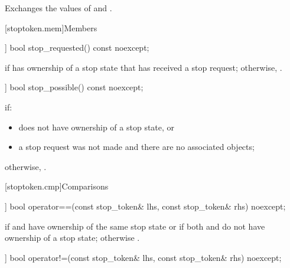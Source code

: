 \begin{itemdescr}
\pnum
\effects
Exchanges the values of  and .
\end{itemdescr}

[stoptoken.mem]{Members}

%
\begin{itemdecl}
[[nodiscard]] bool stop_requested() const noexcept;
\end{itemdecl}

\begin{itemdescr}
\pnum
\returns
{} if  has ownership of a stop state
that has received a stop request;
otherwise, .
\end{itemdescr}

%
\begin{itemdecl}
[[nodiscard]] bool stop_possible() const noexcept;
\end{itemdecl}

\begin{itemdescr}
\pnum
\returns
{} if:
\begin{itemize}
\item {} does not have ownership of a stop state, or
\item a stop request was not made
      and there are no associated  objects;
\end{itemize}
otherwise, .
\end{itemdescr}

[stoptoken.cmp]{Comparisons}

%
\begin{itemdecl}
[[nodiscard]] bool operator==(const stop_token& lhs, const stop_token& rhs) noexcept;
\end{itemdecl}

\begin{itemdescr}
\pnum
\returns
{} if  and  have ownership of the same stop state
or if both  and  do not have ownership of a stop state;
otherwise .
\end{itemdescr}

%
\begin{itemdecl}
[[nodiscard]] bool operator!=(const stop_token& lhs, const stop_token& rhs) noexcept;
\end{itemdecl}

